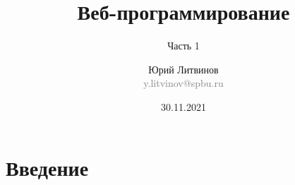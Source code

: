 \documentclass[xetex,mathserif,serif]{beamer}
\title{Веб-программирование}
\subtitle{Часть 1}
\author[Юрий Литвинов]{Юрий Литвинов\\\small{\textcolor{gray}{y.litvinov@spbu.ru}}}
\date{30.11.2021}
\begin{document}
    \frame{\titlepage}



    \section{Введение}
\end{document}
